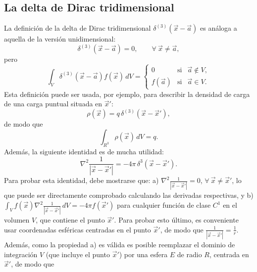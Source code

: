 \subsection{La delta de Dirac tridimensional}
 La definición de la delta de Dirac tridimensional $\delta^{(3)}(\vec x-\vec
a)$ es análoga a aquella de la versión unidimensional:
\begin{equation}
  \delta^{(3)}(\vec x-\vec a) = 0,\qquad \forall\  \vec x\not=\vec a ,
\end{equation}
pero
\begin{equation}
  \int_V \delta^{(3)}(\vec x-\vec a) f(\vec x)\,dV = \left\{\begin{array}{ccl}
 0 & \text{si} & \vec{a}\notin V ,\\
f(\vec{a})& \text{si} & \vec{a}\in V .
\end{array}\right.
\end{equation}
 Esta definición puede ser usada, por ejemplo, para describir la densidad
de carga de una carga puntual situada en $\vec{x}'$:
\begin{equation}
  \rho(\vec{x}) = q\,\delta^{(3)}(\vec x-\vec{x}'),
 \end{equation}
de modo que
\begin{equation}
 \int_{R^3}\rho(\vec x)\, dV= q.
\end{equation}
 Además, la siguiente identidad es de mucha utilidad:
\begin{equation}
  \boxed{\nabla^2\frac 1{|\vec x-\vec x'|} = -4\pi\,\delta^3(\vec x-\vec x').}
\label{dreid1}
\end{equation}
Para probar esta identidad, debe mostrarse que: a) $\nabla^2\frac 1{|\vec x-\vec
x'|}=0$, $\forall\ \vec x\not= \vec x'$, lo que puede ser directamente
comprobado calculando las derivadas respectivas, y b)  $\int_V
f(\vec x)\nabla^2\frac 1{|\vec x-\vec x'|}\, dV=-4\pi f(\vec x')$  para
cualquier función de clase $C^1$ en el volumen $V$, que contiene el punto $\vec
x'$. Para probar esto último, es conveniente usar coordenadas esféricas
centradas en el punto $\vec x'$, de modo que $\frac 1{|\vec x-\vec
x'|}=\frac{1}{r}$. Además, como la propiedad a) es válida es posible
reemplazar el dominio de integración $V$ (que incluye el punto $\vec x'$) por
una esfera $E$ de radio $R$, centrada en $\vec x'$, de modo que
